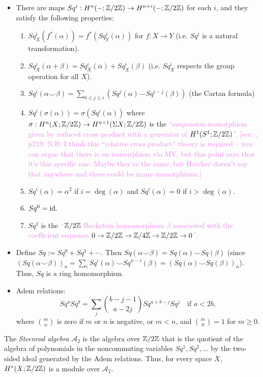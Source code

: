 \documentclass{MetricNotes2023}
\def\inte{\ensuremath\mathbb{Z}}
\def\id{\ensuremath\text{id}}
\def\textcolour{\textcolor}
\begin{document}
\begin{itemize}
\item There are maps \(Sq^i : H^n(-; \inte/2\inte)\to H^{n+i}(- ; \inte/2\inte)\) for each \(i\), and they satisfy the following properties: \begin{enumerate}
\item \(Sq^i_X(f^*(\alpha))=f^*(Sq^i_Y(\alpha))\) for \(f : X \to Y\) (i.e. \(Sq^i\) is a natural transformation).
\item \(Sq^i_X(\alpha + \beta)=Sq^i_X(\alpha)+Sq^i_X(\beta)\) (i.e. \(Sq_X^i\) respects the group operation for all \(X\)).
\item \(Sq^i(\alpha \smile \beta)=\sum\limits_{0\leq j \leq i} (Sq^j(\alpha)\smile Sq^{i-j}(\beta))\) (the Cartan formula)
\item \(Sq^i(\sigma(\alpha))=\sigma(Sq^i(\alpha))\) where \(\sigma : H^n(X; \inte/2\inte)\to H^{n+1}(\Sigma X; \inte/2\inte)\) is the \textcolour{violet}{``suspension isomorphism given by reduced cross product with a generator of \(H^1(S^1; \inte/2\inte)\)''. [see: \autocite{hatcher}, p219. N.B: I think this ``relative cross product'' theory is required -- you can argue that there is an isomorphism via MV, but this point says that it's this specific one. Maybe they're the same, but Hatcher doesn't say that anywhere and there could be many isomorphisms.]}
\item \(Sq^i(\alpha)=\alpha^2\) if \(i=\deg(\alpha)\) and \(Sq^i(\alpha)=0\) if \(i> \deg(\alpha)\). 
\item \(Sq^0=\id.\)
\item \(Sq^1\) is the \textcolour{violet}{``\(\inte/2\inte\) Bockstein homomorphism \(\beta\) associated with the coefficient sequence \(0 \to \inte/2\inte \to \inte/4\inte \to \inte/2\inte \to 0\)''.}
\end{enumerate}
\item Define \(Sq:=Sq^0+Sq^1+\cdots\). Then \(Sq(\alpha\smile \beta)=Sq(\alpha)\smile Sq(\beta)\) (since \((Sq(\alpha\smile \beta))_n=\sum_iSq^i(\alpha)\smile Sq^{n-i}(\beta)=(Sq(\alpha)\smile Sq(\beta))_n\)). Thus, \(Sq\) is a ring homomorphism. 
\item Adem relations:
\[Sq^aSq^b=\sum_j {b-j-1\choose a-2j}Sq^{a+b-j}Sq^j \quad \text{if } a<2b,\]
where \({m \choose n}\) is zero if \(m\) or \(n\) is negative, or \(m<n\), and \({m \choose 0}=1\) for \(m \geq 0\).
\end{itemize}

\begin{definition}
The \textit{Steenrod algebra} \(\mathscr{A}_2\) is the algebra over \(\inte/2\inte\) that is the quotient of the algebra of polynomials in the noncommuting variables \(Sq^1, Sq^2, ...\) by the two-sided ideal generated by the Adem relations. Thus, for every space \(X\), \(H^*(X; \inte/2\inte)\) is a module over \(\mathscr A_2\).
\end{definition}
\end{document}
